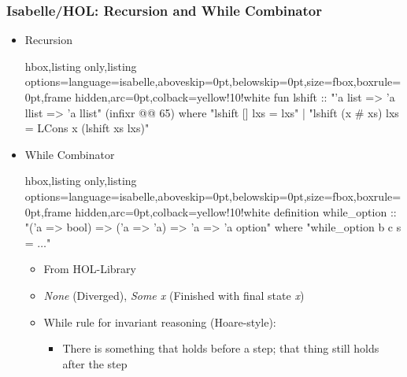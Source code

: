 \documentclass[aspectratio=169,10pt]{beamer}
\begin{document}
\begin{frame}[fragile]
  \frametitle{Isabelle/HOL: Recursion and While Combinator}
  \begin{itemize}
    \item Recursion
          \begin{tcblisting}{hbox,listing only,listing options={language=isabelle,aboveskip=0pt,belowskip=0pt},size=fbox,boxrule=0pt,frame hidden,arc=0pt,colback=yellow!10!white}
fun lshift :: "'a list => 'a llist => 'a llist" (infixr @@ 65) where
  "lshift [] lxs = lxs"
| "lshift (x # xs) lxs = LCons x (lshift xs lxs)"
          \end{tcblisting}
    \item While Combinator
          \begin{tcblisting}{hbox,listing only,listing options={language=isabelle,aboveskip=0pt,belowskip=0pt},size=fbox,boxrule=0pt,frame hidden,arc=0pt,colback=yellow!10!white}
definition while_option :: "('a => bool) => ('a => 'a) => 'a => 'a option" where
"while_option b c s = $\ldots$"
          \end{tcblisting}
          \begin{itemize}
            \item From HOL-Library
            \item \textit{None} (Diverged), \textit{Some x} (Finished with final state \textit{x})
    \item While rule for invariant reasoning (Hoare-style):
          \begin{itemize}
            \item There is something that holds before a step; that thing still holds after the step
          \end{itemize}
          \end{itemize}
  \end{itemize}
\end{frame}
\end{document}
